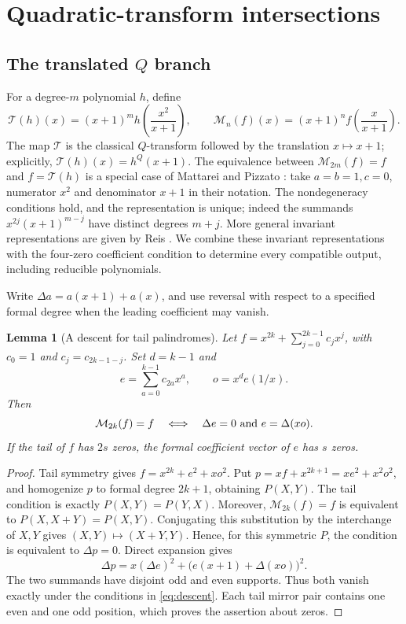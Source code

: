 \documentclass[11pt]{article}
\newtheorem{lemma}[proposition]{Lemma}
\theoremstyle{definition}
\theoremstyle{remark}
\begin{document}
\section{Quadratic-transform intersections}
\label{sec:quadratic}
\subsection{The translated \texorpdfstring{$Q$}{Q} branch}
For a degree-$m$ polynomial $h$, define
\begin{equation}\label{eq:quadratic-transform}
 \mathcal T(h)(x)=(x+1)^m h\!\left(\frac{x^2}{x+1}\right),\qquad
 \mathcal M_n(f)(x)=(x+1)^n f\!\left(\frac{x}{x+1}\right).
\end{equation}
The map $\mathcal T$ is the classical $Q$-transform followed by the
translation $x\mapsto x+1$; explicitly, $\mathcal T(h)(x)=h^Q(x+1)$.
The equivalence between
$\mathcal M_{2m}(f)=f$ and $f=\mathcal T(h)$ is a special case of
Mattarei and Pizzato \cite[Lemma 9]{MP17}: take $a=b=1,c=0$,
numerator $x^2$ and denominator $x+1$ in their notation.
The nondegeneracy conditions hold, and the representation is unique;
indeed the summands $x^{2j}(x+1)^{m-j}$ have distinct degrees $m+j$.
More general invariant representations are given by Reis
\cite[Theorem 1.3]{Reis20}. We combine these invariant representations
with the four-zero coefficient condition to determine every compatible
output, including reducible polynomials.

Write $\Delta a=a(x+1)+a(x)$, and use reversal with respect to a
specified formal degree when the leading coefficient may vanish.

\begin{lemma}[A descent for tail palindromes]\label{lem:descent}
Let $f=x^{2k}+\sum_{j=0}^{2k-1}c_jx^j$, with $c_0=1$ and
$c_j=c_{2k-1-j}$. Set $d=k-1$ and
\[
 e=\sum_{a=0}^{k-1}c_{2a}x^a,\qquad o=x^d e(1/x).
\]
Then
\begin{equation}\label{eq:descent}
 \mathcal M_{2k}(f)=f
 \quad\Longleftrightarrow\quad
 \Delta e=0\ \hbox{and}\ e=\Delta(xo).
\end{equation}
If the tail of $f$ has $2s$ zeros, the formal coefficient vector of
$e$ has $s$ zeros.
\end{lemma}
\begin{proof}
Tail symmetry gives $f=x^{2k}+e^2+xo^2$. Put
$p=xf+x^{2k+1}=xe^2+x^2o^2$, and homogenize $p$ to formal degree
$2k+1$, obtaining $P(X,Y)$. The tail condition is exactly
$P(X,Y)=P(Y,X)$. Moreover, $\mathcal M_{2k}(f)=f$ is equivalent
to $P(X,X+Y)=P(X,Y)$. Conjugating this substitution by the
interchange of $X,Y$ gives $(X,Y)\mapsto(X+Y,Y)$. Hence, for
this symmetric $P$, the condition is equivalent to $\Delta p=0$.
Direct expansion gives
\[
 \Delta p=x(\Delta e)^2+
 \bigl(e(x+1)+\Delta(xo)\bigr)^2.
\]
The two summands have disjoint odd and even supports. Thus both
vanish exactly under the conditions in \eqref{eq:descent}.
Each tail mirror pair contains one even and one odd position,
which proves the assertion about zeros.
\end{proof}
\end{document}
